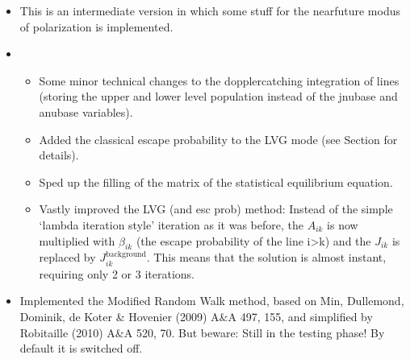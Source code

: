 \documentclass[letterpaper,10pt,english]{sphinxmanual}
\begin{document}
\begin{itemize}
\begin{itemize}
\begin{itemize}
\item {} 
For the 1\sphinxhyphen{}D plane\sphinxhyphen{}parallel mode it is possible to include parallel
beams of radiative flux impinging on the 1\sphinxhyphen{}D atmosphere.

\item {} 
Attila Juhasz has improved the VTK output: Now it also supports
3\sphinxhyphen{}D spherical coordinates. Thanks, Attila!

\end{itemize}

\end{itemize}

\item {} 

This is an intermediate version in which some stuff for the near\sphinxhyphen{}future
modus of polarization is implemented.

\item {} 
\begin{itemize}
\item {} 
Some minor technical changes to the doppler\sphinxhyphen{}catching integration of
lines (storing the upper and lower level population instead of the
jnubase and anubase variables).

\item {} 
Added the classical escape probability to the LVG mode (see Section
{\hyperref[\detokenize{lineradtrans:sec-lvg}]{}} for details).

\item {} 
Sped up the filling of the matrix of the statistical equilibrium
equation.

\item {} 
Vastly improved the LVG (and esc prob) method: Instead of the simple
‘lambda iteration style’ iteration as it was before, the \(A_{ik}\) is
now multiplied with \(\beta_{ik}\) (the escape probability of the line
i\sphinxhyphen{}\textgreater{}k) and the \(J_{ik}\) is replaced by
\(J_{ik}^{\mathrm{background}}\). This means that the solution is almost
instant, requiring only 2 or 3 iterations.

\end{itemize}

\item {} 

Implemented the Modified Random Walk method, based on Min, Dullemond,
Dominik, de Koter \& Hovenier (2009) A\&A 497, 155, and simplified by
Robitaille (2010) A\&A 520, 70. But beware: Still in the testing
phase! By default it is switched off.


\end{itemize}
\end{document}

